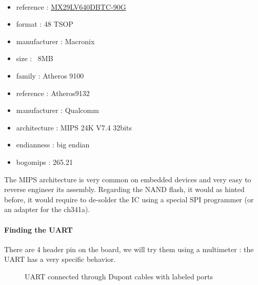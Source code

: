\documentclass{article}
\begin{document}
\\
\begin{minipage}[t]{0.3\textwidth}
\end{minipage} %
\vspace{0.5cm}
\hfill
\begin{minipage}[t]{0.7\textwidth}
	\begin{itemize}
		\itemsep0em
		\item reference : \href{https://www.alldatasheet.com/datasheet-pdf/view/267962/MCNIX/MX29LV640DBTC-90G.html}{MX29LV640DBTC-90G}
		\item format : 48 TSOP
		\item manufacturer : Macronix
		\item size : ~8MB
	\end{itemize}
\end{minipage}
\begin{minipage}[t]{0.3\textwidth}
\end{minipage} %
\vspace{0.5cm}
\hfill
\begin{minipage}[t]{0.7\textwidth}
	\begin{itemize}
		\item family : Atheros 9100
		\item reference : Atheros9132
		\item manufacturer : Qualcomm
		\item architecture : MIPS 24K V7.4 32bits
		\item endianness : big endian
		\item bogomips : 265.21
	\end{itemize}
\end{minipage}
\noindent The MIPS architecture is very common on embedded devices and very easy to reverse engineer its assembly. Regarding the NAND flash, it would as hinted before, it would require to de-solder the IC using a special SPI programmer (or an adapter for the ch341a).
\paragraph{Finding the UART} There are 4 header pin on the board, we will try them using a multimeter : the UART has a very specific behavior.

\begin{figure}[!ht]
	
	\caption{UART connected through Dupont cables with labeled ports}
\end{figure}
\end{document}
